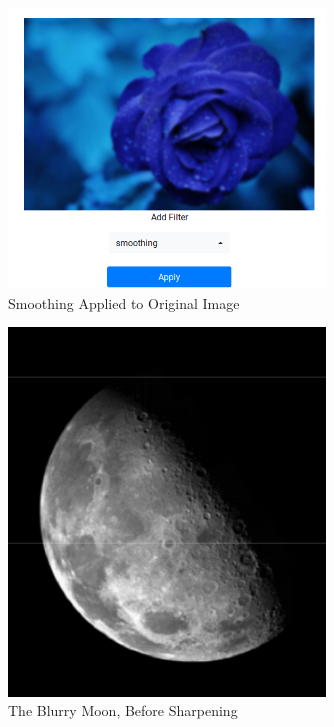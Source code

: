 \documentclass{article}
\begin{document}
  \begin{figure}[!htb]
    \centering
    \includegraphics[width=0.75\textwidth]{assets/smoothing.png}
    \caption{Smoothing Applied to Original Image}
    \label{fig:smoothing}
  \end{figure}

  \begin{figure}[!htb]
    \centering
    \includegraphics[width=0.75\textwidth]{assets/moon_original.png}
    \caption{The Blurry Moon, Before Sharpening}
    \label{fig:before-sharpening}
  \end{figure}
\end{document}

